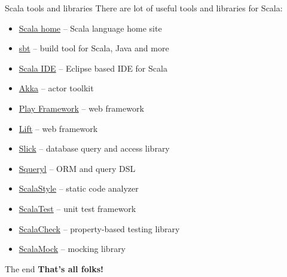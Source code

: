 \documentclass{beamer}
\begin{document}
\begin{frame}{Scala tools and libraries}
There are lot of useful tools and libraries for Scala:
\begin{itemize}
\item \href{http://www.scala-lang.org}{Scala home} -- Scala language home site
\item \href{http://www.scala-sbt.org}{sbt} -- build tool for Scala, Java and more
\item \href{http://www.scala-ide.org}{Scala IDE} -- Eclipse based IDE for Scala
\item \href{http://www.akka.io}{Akka} -- actor toolkit
\item \href{http://www.playframework.com}{Play Framework} -- web framework
\item \href{http://www.liftweb.net}{Lift} -- web framework
\item \href{http://slick.typesafe.com}{Slick} -- database query and access library
\item \href{http://squeryl.org}{Squeryl} -- ORM and query DSL
\item \href{http://www.scalastyle.org/}{ScalaStyle} -- static code analyzer
\item \href{http://www.scalatest.org}{ScalaTest} -- unit test framework
\item \href{http://www.scalacheck.org}{ScalaCheck} -- property-based testing library
\item \href{http://www.scalamock.org}{ScalaMock} -- mocking library
\end{itemize}
\end{frame}

\begin{frame}{The end}
\centering
\textbf{That's all folks!}
\end{frame}
\end{document}
